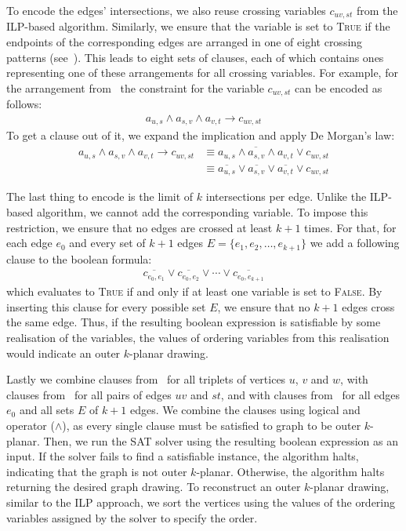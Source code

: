 To encode the edges' intersections, we also reuse crossing variables \(c_{uv, st}\) from the ILP-based algorithm. Similarly, we ensure that the variable is set to \textsc{True} if the endpoints of the corresponding edges are arranged in one of eight crossing patterns (see~). This leads to eight sets of clauses, each of which contains ones representing one of these arrangements for all crossing variables. For example, for the arrangement from~ the constraint for the variable \(c_{uv, st}\) can be encoded as follows:
\begin{align*}
    a_{u,s} \land a_{s,v} \land a_{v,t} \rightarrow c_{uv, st}
\end{align*}
To get a clause out of it, we expand the implication and apply De Morgan's law:
\begin{align}
    a_{u,s} \land a_{s,v} \land a_{v,t} \rightarrow c_{uv, st}
    & \equiv \overline{a_{u,s} \land a_{s,v} \land a_{v,t}} \lor c_{uv, st} \nonumber \\
    & \equiv \overline{a_{u,s}} \lor \overline{a_{s,v}} \lor \overline{a_{v,t}} \lor c_{uv, st} \label{sat:crossing-vars}
\end{align}

The last thing to encode is the limit of \(k\) intersections per edge. Unlike the ILP-based algorithm, we cannot add the corresponding variable. To impose this restriction, we ensure that no edges are crossed at least \(k+1\) times. For that, for each edge \(e_0\) and every set of \(k+1\) edges \(E = \{e_1, e_2, \dots, e_{k+1}\}\) we add a following clause to the boolean formula:
\begin{align}
    \overline{c_{e_0, e_1}} \lor \overline{c_{e_0, e_2}} \lor \cdots \lor \overline{c_{e_0, e_{k+1}}} \label{sat:cr-limit}
\end{align}
which evaluates to \textsc{True} if and only if at least one variable is set to \textsc{False}. By inserting this clause for every possible set \(E\), we ensure that no \(k+1\) edges cross the same edge. Thus, if the resulting boolean expression is satisfiable by some realisation of the variables, the values of ordering variables from this realisation would indicate an outer \(k\)-planar drawing.

Lastly we combine clauses from~ for all triplets of vertices \(u\), \(v\) and \(w\), with clauses from~ for all pairs of edges \(uv\) and \(st\), and with clauses from~ for all edges \(e_0\) and all sets \(E\) of \(k+1\) edges. We combine the clauses using logical and operator (\(\land\)), as every single clause must be satisfied to graph to be outer \(k\)-planar. Then, we run the SAT solver using the resulting boolean expression as an input. If the solver fails to find a satisfiable instance, the algorithm halts, indicating that the graph is not outer \(k\)-planar. Otherwise, the algorithm halts returning the desired graph drawing. To reconstruct an outer \(k\)-planar drawing, similar to the ILP approach, we sort the vertices using the values of the ordering variables assigned by the solver to specify the order.

